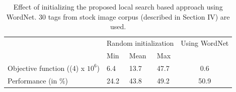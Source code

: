 \begin{table}[htbp]
\begin{center}
\caption{Effect of initializing the proposed local search based approach using WordNet. 30 tags from stock image corpus (described in Section IV) are used. }
\label{tab:WordNetRandominitGWS30}
\begin{tabular}{lllll}
\toprule 
     & \multicolumn{3}{c}{Random initialization} & \multicolumn{1}{c}{Using WordNet}\\

    & Min & Mean & Max & \multicolumn{1}{c}{}  \\
    \midrule
    Objective function ((4) x $10^6$) & 6.4    & 13.7  &  47.7  & \multicolumn{1}{c}{0.6} \\
    Performance (in \%) & 24.2    &43.8  & 49.2  & \multicolumn{1}{c}{50.9} \\
    \bottomrule
\end{tabular}
\end{center}
\end{table}